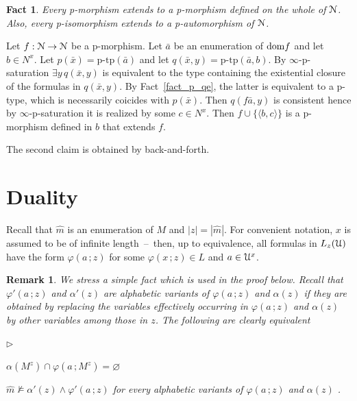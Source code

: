 \documentclass{amsproc}
\makeatletter
\def\A{\EuScript A}
\def\U{\EuScript U}
\def\B{\EuScript B}
\def\N{\EuScript N}
\def\phi{\varphi}
\newcommand{\mylabel}[1]{{#1}\hfill}
\renewenvironment{itemize}
  {\begin{list}{$\triangleright$}{%
  \setlength{\parskip}{0mm}
  \setlength{\topsep}{.1\baselineskip}
  \setlength{\rightmargin}{0mm}
  \setlength{\listparindent}{0mm}
  \setlength{\itemindent}{0mm}
  \setlength{\labelwidth}{3ex}
  \setlength{\itemsep}{.1\baselineskip}
  \setlength{\parsep}{.1\baselineskip}
  \setlength{\partopsep}{0mm}
  \setlength{\labelsep}{1ex}
  \setlength{\leftmargin}{\labelwidth+\labelsep}
  \let\makelabel\mylabel}}{%
\end{list}}
\newcounter{thm}
\theoremstyle{mio}
\newtheorem{fact}[thm]{Fact}\tcolorboxenvironment{fact}{mythm}
\newtheorem{remark}[thm]{Remark}\tcolorboxenvironment{remark}{mythm}
\providecommand{\proofNameStyle}{\bfseries}
\renewenvironment{proof}[1][\proofname]{\par
  \pushQED{\qed}%
  \normalfont%
  \trivlist
  \item[\hskip\labelsep
        \proofNameStyle
    #1\@addpunct{.}]\ignorespaces
}{%
  \popQED\endtrivlist\@endpefalse
}
\renewcommand*{\emph}[1]{%
   \smash{\tikz[baseline]\node[rectangle, fill=teal!25, rounded corners, inner xsep=0.5ex, inner ysep=0.2ex, anchor=base, minimum height = 2.7ex]{\strut #1};}}
\makeatother
\begin{document}


\begin{fact}\label{fact_phogeneity}
  Every p-morphism extends to a p-morphism defined on the whole of $\N$.
  Also, every p-isomorphism extends to a p-automorphism of $\N$.
\end{fact}

\begin{proof}
  Let $f:\N\to\N$ be a p-morphism.
  Let $\bar a$ be an enumeration of ${\rm dom} f$ and let $b\in N^x$.
  Let $p(\bar x)=\textrm{p-tp}(\bar a)$ and let $q(\bar x,y)=\textrm{p-tp}(\bar a,b)$.
  By $\infty$-p-saturation $\exists y\,q(\bar x,y)$ is equivalent to the type containing the existential closure of the formulas in $q(\bar x,y)$.
  By Fact~\ref{fact_p_qe}, the latter is equivalent to a p-type, which is necessarily coicides with $p(\bar x)$.
  Then $q(f\bar a,y)$ is consistent hence by $\infty$-p-saturation it is realized by some $c\in N^x$.
  Then $f\cup\{\langle b,c\rangle\}$ is a p-morphism defined in $b$ that extends $f$.

  The second claim is obtained by back-and-forth.
\end{proof}

\section{Duality}

Recall that $\hat m$ is an enumeration of $M$ and $|z|=|\hat m|$.
For convenient notation, $x$ is assumed to be of infinite length~--~then, up to equivalence, all formulas in $L_z(\U)$ have the form $\phi(a\,;z)$ for some $\phi(x\,;z)\in L$ and $a\in\U^x$.

\begin{remark}
  We stress a simple fact which is used in the proof below. 
  Recall that $\phi'(a\,;z)$ and $\alpha'(z)$ are alphabetic variants of $\phi(a\,;z)$ and $\alpha(z)$ if they are obtained by replacing the variables effectively occurring in $\phi(a\,;z)$ and $\alpha(z)$ by other variables among those in $z$.
  The following are clearly equivalent
  \begin{itemize}
    \item[1.] $\alpha(M^z)\cap\phi(a\,;M^z)=\varnothing$
    \item[2.] $\hat m\not\models\alpha'(z)\wedge\phi'(a\,;z)$ for every alphabetic variants of $\phi(a\,;z)$ and $\alpha(z)$ .
  \end{itemize}
\end{remark} 
\end{document}
